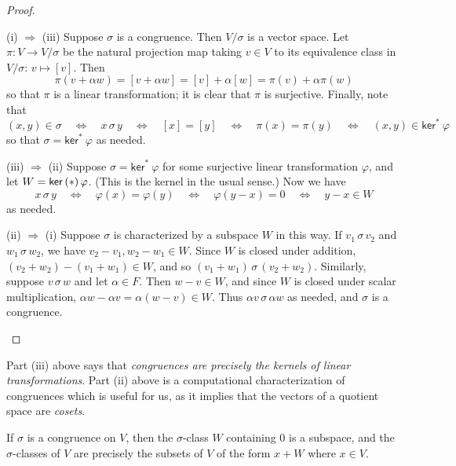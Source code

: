 \documentclass{memoir}
\begin{document}
\begin{proof} \mbox{}
\begin{enumerate*}
\item[(i) $\Rightarrow$ (iii)] Suppose $\sigma$ is a congruence. Then $V/\sigma$ is a vector space. Let $\pi : V \rightarrow V/\sigma$ be the natural projection map taking $v \in V$ to its equivalence class in $V/\sigma$: $v \mapsto [v]$. Then \[ \pi(v+\alpha w) = [v+\alpha w] = [v] + \alpha[w] = \pi(v) + \alpha\pi(w) \] so that $\pi$ is a linear transformation; it is clear that $\pi$ is surjective. Finally, note that  \[ (x,y) \in \sigma \quad \Leftrightarrow \quad x \,\sigma\, y \quad \Leftrightarrow \quad [x] = [y] \quad \Leftrightarrow \quad \pi(x) = \pi(y) \quad \Leftrightarrow \quad (x,y) \in \mathsf{ker}^\ast\ \varphi \] so that $\sigma = \mathsf{ker}^\ast\ \varphi$ as needed.
\item[(iii) $\Rightarrow$ (ii)] Suppose $\sigma = \mathsf{ker}^\ast\ \varphi$ for some surjective linear transformation $\varphi$, and let $W = \operatorname{\mathsf{ker}}\left(*\right){\varphi}$. (This is the kernel in the usual sense.) Now we have \[ x \,\sigma\, y \quad \Leftrightarrow \quad \varphi(x) = \varphi(y) \quad \Leftrightarrow \quad \varphi(y-x) = 0 \quad \Leftrightarrow \quad y-x \in W \] as needed.
\item[(ii) $\Rightarrow$ (i)] Suppose $\sigma$ is characterized by a subspace $W$ in this way. If $v_1 \,\sigma\, v_2$ and $w_1 \,\sigma\, w_2$, we have $v_2-v_1, w_2-w_1 \in W$. Since $W$ is closed under addition, $(v_2+w_2) - (v_1+w_1) \in W$, and so $(v_1+w_1) \,\sigma\, (v_2+w_2)$. Similarly, suppose $v \,\sigma\, w$ and let $\alpha \in F$. Then $w-v \in W$, and since $W$ is closed under scalar multiplication, $\alpha w - \alpha v = \alpha(w-v) \in W$. Thus $\alpha v \,\sigma\, \alpha w$ as needed, and $\sigma$ is a congruence. \qedhere
\end{enumerate*}
\end{proof}

Part (iii) above says that \emph{congruences are precisely the kernels of linear transformations}. Part (ii) above is a computational characterization of congruences which is useful for us, as it implies that the vectors of a quotient space are \emph{cosets}.

\begin{prp}
If $\sigma$ is a congruence on $V$, then the $\sigma$-class $W$ containing 0 is a subspace, and the $\sigma$-classes of $V$ are precisely the subsets of $V$ of the form $x+W$ where $x \in V$.
\end{prp}
\end{document}

